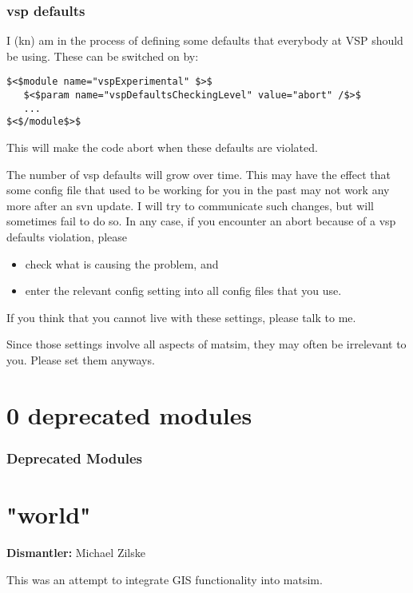 \documentclass[a4paper,11pt]{report}
\begin{document}
\subsubsection{vsp defaults}

I (kn) am in the process of defining some defaults that everybody at VSP should be using. These can be switched on by:
\begin{verbatim}
$<$module name="vspExperimental" $>$
   $<$param name="vspDefaultsCheckingLevel" value="abort" /$>$
   ...
$<$/module$>$

\end{verbatim}

This will make the code abort when these defaults are violated.

The number of vsp defaults will grow over time. This may have  the effect that some config file that used to be working for you in the  past may not work any more after an svn update. I will try to  communicate such changes, but will sometimes fail to do so. In any  case, if you encounter an abort because of a vsp defaults violation,  please
\begin{itemize}
	\item check what is causing the problem, and
	\item enter the relevant config setting into all config files that you use.
\end{itemize}

If you think that you cannot live with these settings, please talk to me.

Since those settings involve all aspects of matsim, they may often be irrelevant to you. Please set them anyways.

\vfill\eject
\section{0 deprecated modules}

\subsubsection{Deprecated Modules}

\vfill\eject
\section{"world"}

\textbf{Dismantler:} Michael Zilske

This was an attempt to integrate GIS functionality into matsim.
\end{document}
